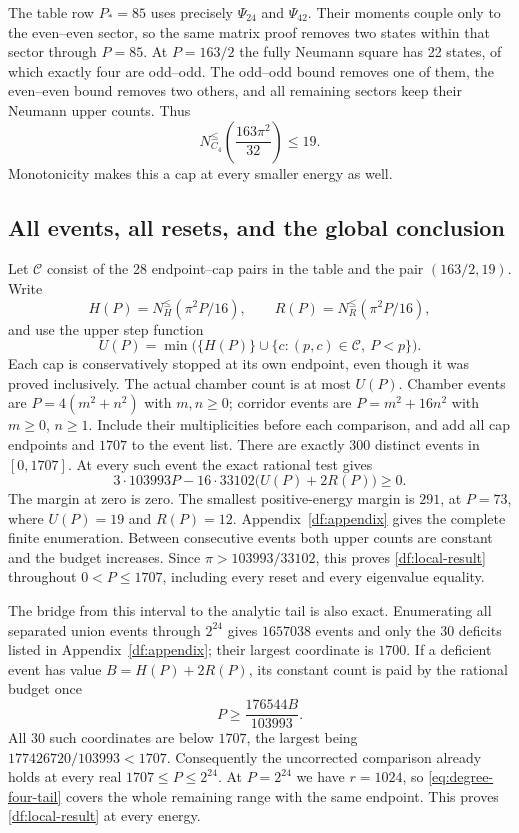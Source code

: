 \documentclass[11pt,reqno]{amsart}
\numberwithin{equation}{section}
\begin{document}
The table row $P_*=85$ uses precisely $\Psi_{24}$ and $\Psi_{42}$.
Their moments couple only to the even--even sector, so the same
matrix proof removes two states within that sector through $P=85$.
At $P=163/2$ the fully Neumann square has 22 states, of which exactly
four are odd--odd. The odd--odd bound removes one of them, the
even--even bound removes two others, and all remaining sectors keep
their Neumann upper counts. Thus
\begin{equation}
 N_{C_4}^{\le}\left(\frac{163\pi^2}{32}\right)\le19.
 \label{df:special-cap}
\end{equation}
Monotonicity makes this a cap at every smaller energy as well.

\subsection{All events, all resets, and the global conclusion}

Let $\mathcal C$ consist of the 28 endpoint--cap pairs in the table
and the pair $(163/2,19)$. Write
\[
 H(P)=N_H^{\le}(\pi^2P/16),\qquad
 R(P)=N_R^{\le}(\pi^2P/16),
\]
and use the upper step function
\begin{equation}
 U(P)=\min\bigl(\{H(P)\}\cup\{c:(p,c)\in\mathcal C,\ P<p\}\bigr).
 \label{df:upper-step}
\end{equation}
Each cap is conservatively stopped at its own endpoint, even though
it was proved inclusively. The actual chamber count is at most $U(P)$.
Chamber events are $P=4(m^2+n^2)$ with $m,n\ge0$; corridor events are
$P=m^2+16n^2$ with $m\ge0$, $n\ge1$. Include their multiplicities
before each comparison, and add all cap endpoints and $1707$ to the
event list. There are exactly 300 distinct events in $[0,1707]$.
At every such event the exact rational test gives
\begin{equation}
 3\cdot103993P-16\cdot33102\bigl(U(P)+2R(P)\bigr)\ge0.
 \label{df:corrected-events}
\end{equation}
The margin at zero is zero. The smallest positive-energy margin is
$291$, at $P=73$, where $U(P)=19$ and $R(P)=12$.
Appendix~\ref{df:appendix} gives the complete finite enumeration.
Between consecutive events both upper counts are constant and the
budget increases. Since $\pi>103993/33102$, this proves
\eqref{df:local-result} throughout $0<P\le1707$, including every
reset and every eigenvalue equality.

The bridge from this interval to the analytic tail is also exact.
Enumerating all separated union events through $2^{24}$ gives
$1657038$ events and only the 30 deficits listed in
Appendix~\ref{df:appendix}; their largest coordinate is $1700$.
If a deficient event has value $B=H(P)+2R(P)$, its constant count is
paid by the rational budget once
\[
 P\ge\frac{176544B}{103993}.
\]
All 30 such coordinates are below $1707$, the largest being
$177426720/103993<1707$. Consequently the uncorrected comparison
already holds at every real $1707\le P\le2^{24}$. At $P=2^{24}$
we have $r=1024$, so \eqref{eq:degree-four-tail} covers the whole
remaining range with the same endpoint. This proves
\eqref{df:local-result} at every energy.
\end{document}
